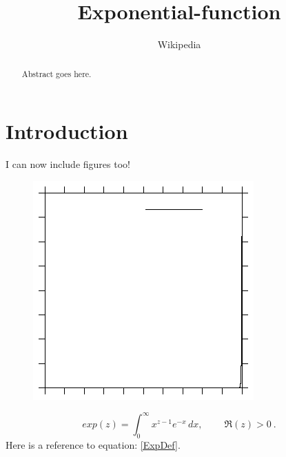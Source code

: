 \documentclass[twocolumn,a4paper]{article}
\begin{document}
\title{Exponential-function}
\author{Wikipedia}
\maketitle
\begin{abstract}
Abstract goes here.
\end{abstract}

\section{Introduction}
I can now include figures too!
\begin{figure}[b]
	\includegraphics{exp_gnuplot}
\end{figure}

\begin{equation}\label{ExpDef}
	exp(z) = \int_0^\infty x^{z-1} e^{-x}\,dx, \ \qquad \Re(z) > 0\ .
\end{equation}
Here is a reference to equation: \ref{ExpDef}. \\
\end{document}
